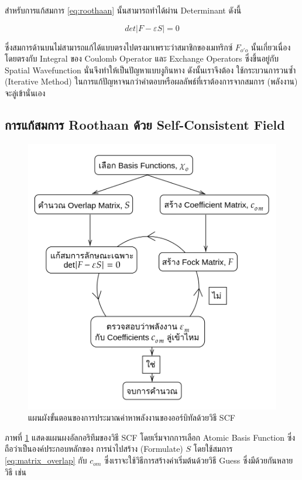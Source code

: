 สำหรับการแก้สมการ \ref{eq:roothaan} นั้นสามารถทำได้ผ่าน Determinant ดังนี้

\begin{equation}\label{eq:scf_secular}
    det|F - \varepsilon S| = 0
\end{equation}

\noindent ซึ่งสมการด้านบนไม่สามารถแก้ได้แบบตรงไปตรงมาเพราะว่าสมาชิกของเมทริกซ์ $F_{o'o}$ นั้นเกี่ยวเนื่องโดยตรงกับ Integral ของ 
Coulomb Operator และ Exchange Operators ซึ่งขึ้นอยู่กับ Spatial Wavefunction นั่นจึงทำให้เป็นปัญหาแบบงูกินหาง ดังนั้นเราจึงต้อง%
ใช้กระบวนการวนซ้ำ (Iterative Method) ในการแก้ปัญหาจนกว่าคำตอบหรือผลลัพธ์ที่เราต้องการจากสมการ (พลังงาน) จะลู่เข้านั่นเอง

\subsection{การแก้สมการ Roothaan ด้วย Self-Consistent Field}
\label{ssec:roothaan_scf}

\begin{figure}[htbp]
    \centering
    \includegraphics[width=0.9\linewidth]{fig/scf.png}
    \caption{แผนผังขั้นตอนของการประมาณค่าหาพลังงานของออร์บิทัลด้วยวิธี SCF}
    \label{fig:scf}
\end{figure}

ภาพที่ \ref{fig:scf} แสดงแผนผงอัลกอริทึมของวิธี SCF โดยเริ่มจากการเลือก Atomic Basis Function ซึ่งถือว่าเป็นองค์ประกอบหลักของ%
การนำไปสร้าง (Formulate) $S$ โดยใช้สมการ \ref{eq:matrix_overlap} กับ $c_{om}$ ซึ่งเราจะใช้วิธีการสร้างค่าเริ่มต้นด้วยวิธี Guess 
ซึ่งมีด้วยกันหลายวิธี เช่น

